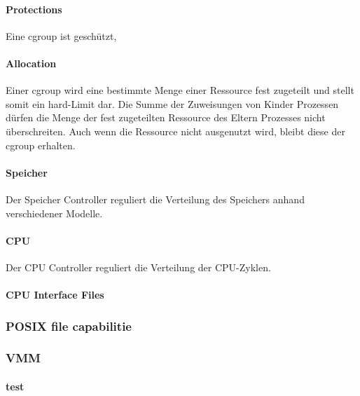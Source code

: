 \documentclass[12pt,a4paper,bibliography=totocnumbered,listof=totocnumbered]{scrartcl}
\begin{document}
\paragraph{Protections}
Eine cgroup ist geschützt, 

\paragraph{Allocation}
Einer cgroup wird eine bestimmte Menge einer Ressource fest zugeteilt und stellt somit ein hard-Limit dar. Die Summe der Zuweisungen von Kinder Prozessen dürfen die Menge der fest zugeteilten Ressource des Eltern Prozesses nicht überschreiten. Auch wenn die Ressource nicht ausgenutzt wird, bleibt diese der cgroup erhalten. 

\paragraph{Speicher}
Der Speicher Controller reguliert die Verteilung des Speichers anhand verschiedener Modelle.

\paragraph{CPU}
Der CPU Controller reguliert die Verteilung der CPU-Zyklen.

\paragraph{CPU Interface Files}




\subsubsection{POSIX file capabilitie}

\subsubsection{VMM}

\paragraph{test}

\pagebreak
\end{document}
